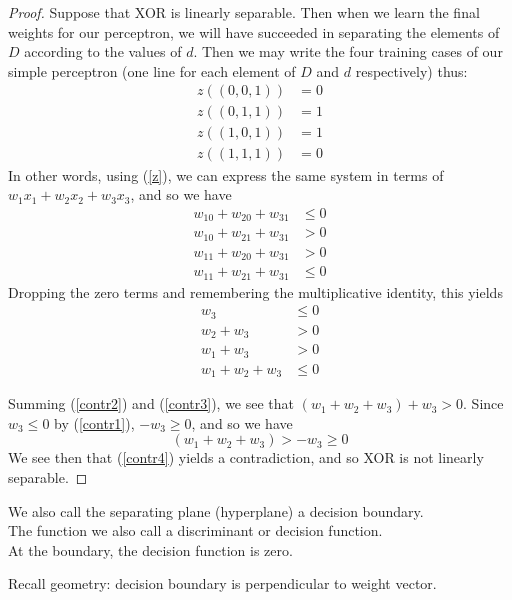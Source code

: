 \begin{proof}
  Suppose that XOR is linearly separable.  Then when we learn the
  final weights for our perceptron, we will have succeeded in
  separating the elements of $D$ according to the values of $d$.  Then
  we may write the four training cases of our simple perceptron (one
  line for each element of $D$ and $d$ respectively) thus:
  \begin{align*}
    z((0,0,1)) & = 0 \\
    z((0,1,1)) & = 1 \\
    z((1,0,1)) & = 1 \\
    z((1,1,1)) & = 0
  \end{align*}
  In other words, using (\ref{z}), we can express the same system in
  terms of $w_1x_1 + w_2x_2 + w_3x_3$, and so we have
  \begin{align*}
    w_10 + w_20 + w_31 & \le 0 \\
    w_10 + w_21 + w_31  & > 0 \\
    w_11 + w_20 + w_31  & > 0 \\
    w_11 + w_21 + w_31  & \le 0
  \end{align*}
  Dropping the zero terms and remembering the multiplicative identity,
  this yields
  \begin{align}
    \label{contr1}
    w_3 & \le 0 \\
    \label{contr2}
    w_2 + w_3  & > 0 \\
    \label{contr3}
    w_1 + w_3   & > 0 \\
    \label{contr4}
    w_1 + w_2  + w_3 & \le 0
\end{align}

Summing (\ref{contr2}) and (\ref{contr3}), we see that
$(w_1+w_2+w_3) + w_3 > 0$.  Since $w_3\le 0$ by (\ref{contr1}),
$-w_3\ge 0$, and so we have
\begin{displaymath}
  (w_1+w_2+w_3) > -w_3 \ge 0
\end{displaymath}
We see then that (\ref{contr4}) yields a contradiction, and so XOR is
not linearly separable.

\end{proof}

\bigskip
We also call the separating plane (hyperplane) a decision boundary. \\
The function we also call a discriminant or decision function.\\
At the boundary, the decision function is zero.

Recall geometry: decision boundary is perpendicular to weight vector.

